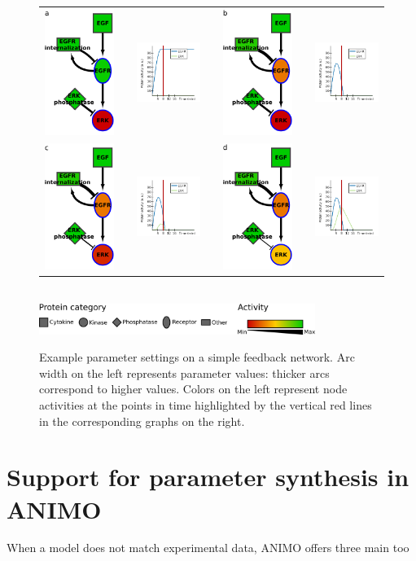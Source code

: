 \documentclass[submission,copyright,creativecommons]{eptcs}
\begin{document}
\def\graphHeight{0.19\textheight}
\begin{figure}
\centering
\begin{tabular}{ccccccc}%
\includegraphics[height=\graphHeight]{images/feedback_params_netA} & \quad & \includegraphics[height=\graphHeight]{images/feedback_params_graphA} &\quad&
\includegraphics[height=\graphHeight]{images/feedback_params_netB} & \quad & \includegraphics[height=\graphHeight]{images/feedback_params_graphB} \\
\includegraphics[height=\graphHeight]{images/feedback_params_netC} & \quad & \includegraphics[height=\graphHeight]{images/feedback_params_graphC} &\quad&
\includegraphics[height=\graphHeight]{images/feedback_params_netD} & \quad & \includegraphics[height=\graphHeight]{images/feedback_params_graphD} \\
\end{tabular}\ \\
\includegraphics[width=0.8\textwidth]{images/legenda_forme_e_colori}%
\caption{Example parameter settings on a simple feedback network.
Arc width on the left represents parameter values: thicker arcs correspond to higher values.
Colors on the left represent node activities at the points in time highlighted by the vertical
red lines in the corresponding graphs on the right.\label{fig:small-example-feedback}}
\end{figure}

\section{Support for parameter synthesis in ANIMO}
When a model does not match experimental data, ANIMO offers three main too
\end{document}

